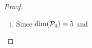\begin{proof}
\begin{enumerate}[(i)]
        Moreover, since $\dim(\P_4)=5$ and $B$ has a length of 5, from Theorem 2.39 Section 2C LADR it follows that $B$ is a basis for $\P_4$.
        Therefore, it is possible that no polynomial in $B$ has degree 2.\qed
        \item Since $\dim(\P_4)=5$ and 
    \end{enumerate}
    \renewcommand{\qedsymbol}{}
\end{proof}